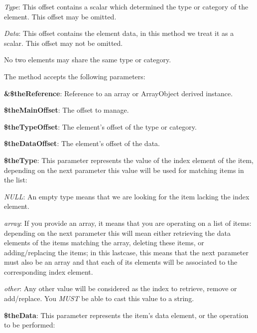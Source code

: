 \begin{DoxyItemize}
\item {\itshape Type}\-: This offset contains a scalar which determined the type or category of the element. This offset may be omitted. 
\item {\itshape Data}\-: This offset contains the element data, in this method we treat it as a scalar. This offset may not be omitted. 
\end{DoxyItemize}

No two elements may share the same type or category.

The method accepts the following parameters\-:


\begin{DoxyItemize}
\item {\bfseries \&\$the\-Reference}\-: Reference to an array or Array\-Object derived instance. 
\item {\bfseries \$the\-Main\-Offset}\-: The offset to manage. 
\item {\bfseries \$the\-Type\-Offset}\-: The element's offset of the type or category. 
\item {\bfseries \$the\-Data\-Offset}\-: The element's offset of the data. 
\item {\bfseries \$the\-Type}\-: This parameter represents the value of the index element of the item, depending on the next parameter this value will be used for matching items in the list\-: 
\begin{DoxyItemize}
\item {\itshape N\-U\-L\-L}\-: An empty type means that we are looking for the item lacking the index element. 
\item {\itshape array}\-: If you provide an array, it means that you are operating on a list of items\-: depending on the next parameter this will mean either retrieving the data elements of the items matching the array, deleting these items, or adding/replacing the items; in this lastcase, this means that the next parameter must also be an array and that each of its elements will be associated to the corresponding index element. 
\item {\itshape other}\-: Any other value will be considered as the index to retrieve, remove or add/replace. You {\itshape M\-U\-S\-T} be able to cast this value to a string. 
\end{DoxyItemize}
\item {\bfseries \$the\-Data}\-: This parameter represents the item's data element, or the operation to be performed\-: 

\end{DoxyItemize}
